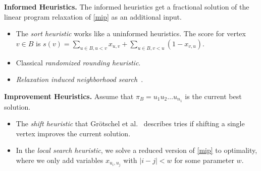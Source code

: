 \documentclass[a4paper,UKenglish,cleveref, autoref, thm-restate]{lipics-v2021}
\begin{document}
\noindent
\textbf{Informed Heuristics.}
The informed heuristics get a fractional solution of the linear program relaxation of \eqref{mip} as an additional input.
\begin{itemize}
\item The \emph{sort heuristic} works like a uninformed heuristics.
The score for vertex $v \in B$ is $s(v) = \sum_{u \in B, u < v} x_{u,v} + \sum_{u \in B, v < u} (1 - x_{v, u})$.
\item Classical \emph{randomized rounding heuristic}.
\item \emph{Relaxation induced neighborhood search}~\cite{danna2005exploring}.
\end{itemize}

\noindent
\textbf{Improvement Heuristics.}
Assume that $\pi_B = u_1u_2 \dots u_{n_1}$ is the current best solution.
\begin{itemize}
\item The \emph{shift heuristic} that Grötschel et al.~\cite{grotschel1984cutting} describes tries if shifting a single vertex improves the current solution.
\item In the \emph{local search heuristic}, we solve a reduced version of \eqref{mip} to optimality, where we only add variables $x_{u_i, u_j}$ with $|i-j| < w$ for some parameter $w$.
\end{itemize}
\end{document}
